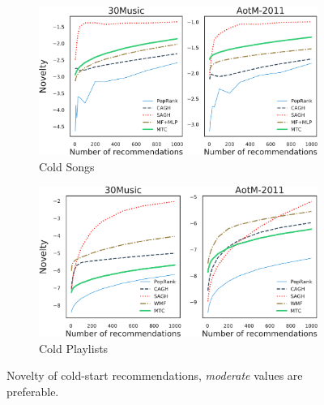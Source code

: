 



\begin{figure}[!t]
    \centering
    \begin{subfigure}[t]{\columnwidth}
        \centering
        \includegraphics[width=\columnwidth]{fig/nov1.pdf}
        \caption{Cold Songs}
        \label{fig:nov1}
    \end{subfigure}
    \begin{subfigure}[t]{\columnwidth}
        \centering
        \includegraphics[width=\columnwidth]{fig/nov3.pdf}
        \caption{Cold Playlists}
        \label{fig:nov3}
    \end{subfigure}
    \caption{Novelty of cold-start recommendations, \emph{moderate} values are preferable.}
\end{figure}
